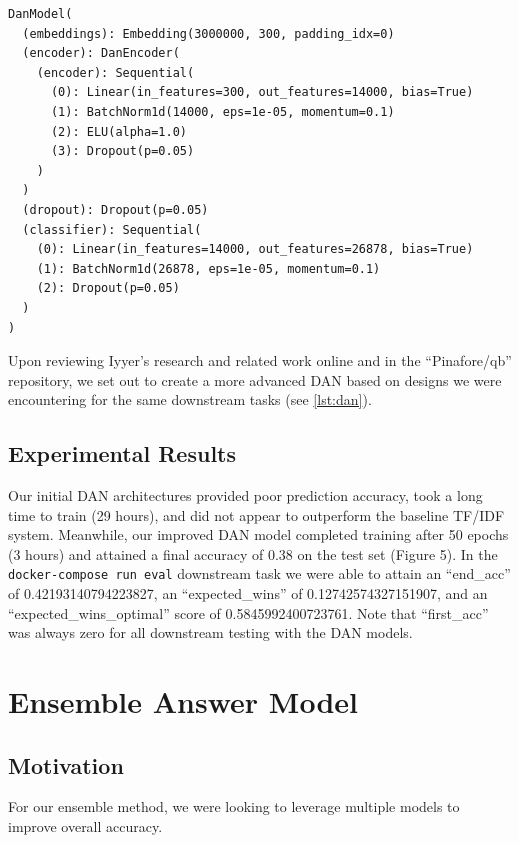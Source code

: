 \documentclass[11pt,a4paper]{article}
\begin{document}
\begin{lstlisting}[caption={\textsc{DAN} Architecture},captionpos=b,label={lst:dan}]
DanModel(
  (embeddings): Embedding(3000000, 300, padding_idx=0)
  (encoder): DanEncoder(
    (encoder): Sequential(
      (0): Linear(in_features=300, out_features=14000, bias=True)
      (1): BatchNorm1d(14000, eps=1e-05, momentum=0.1)
      (2): ELU(alpha=1.0)
      (3): Dropout(p=0.05)
    )
  )
  (dropout): Dropout(p=0.05)
  (classifier): Sequential(
    (0): Linear(in_features=14000, out_features=26878, bias=True)
    (1): BatchNorm1d(26878, eps=1e-05, momentum=0.1)
    (2): Dropout(p=0.05)
  )
)
\end{lstlisting}

Upon reviewing Iyyer's research and related work online and in the ``Pinafore/qb'' repository, we set out to create a more advanced \textsc{DAN} based on designs we were encountering for the same downstream tasks (see \autoref{lst:dan}).

\subsection{Experimental Results}
Our initial \textsc{DAN} architectures provided poor prediction accuracy, took a long time to train (29 hours), and did not appear to outperform the baseline \textsc{TF/IDF} system. Meanwhile, our improved \textsc{DAN} model completed training after 50 epochs (3 hours) and attained a final accuracy of 0.38 on the test set (Figure 5). In the \texttt{docker-compose run eval} downstream task we were able to attain an ``end\_acc'' of 0.42193140794223827, an ``expected\_wins'' of  0.12742574327151907, and an ``expected\_wins\_optimal'' score of  0.5845992400723761.  Note that ``first\_acc'' was always zero for all downstream testing with the \textsc{DAN} models.


\section{Ensemble Answer Model}

\subsection{Motivation}
For our ensemble method, we were looking to leverage multiple models to improve overall accuracy.
\end{document}
